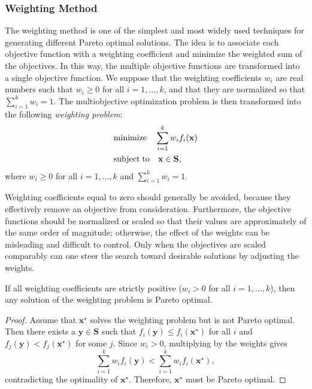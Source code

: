 \subsubsection{Weighting Method}

The weighting method is one of the simplest and most widely used techniques for generating different Pareto optimal solutions. The idea is to associate each objective function with a weighting coefficient and minimize the weighted sum of the objectives. In this way, the multiple objective functions are transformed into a single objective function. We suppose that the weighting coefficients $w_i$ are real numbers such that $w_i \geq 0$ for all $i = 1, \ldots, k$, and that they are normalized so that $\sum_{i=1}^k w_i = 1$. The multiobjective optimization problem is then transformed into the following \emph{weighting problem}:
\begin{align*}
     & \text{minimize}    \quad \sum_{i=1}^k  w_i  f_i(\mathbf{x}) \\
     & \text{subject\;to} \quad \mathbf{x} \in \mathbf{S},
\end{align*}
where $w_i \geq 0$ for all $i = 1, \ldots, k$ and $\sum_{i=1}^k w_i = 1$.

Weighting coefficients equal to zero should generally be avoided, because they effectively remove an objective from consideration. Furthermore, the objective functions should be normalized or scaled so that their values are approximately of the same order of magnitude; otherwise, the effect of the weights can be misleading and difficult to control. Only when the objectives are scaled comparably can one steer the search toward desirable solutions by adjusting the weights.

\begin{proposition}
\label{prop:weighted_method_pareto_optimal}
If all weighting coefficients are strictly positive ($w_i > 0$ for all $i = 1,\ldots,k$), then any solution of the weighting problem is Pareto optimal.
\end{proposition}
\begin{proof}
Assume that $\mathbf{x}^\star$ solves the weighting problem but is not Pareto optimal. Then there exists a $\mathbf{y} \in \mathbf{S}$ such that $f_i(\mathbf{y}) \le f_i(\mathbf{x}^\star)$ for all $i$ and $f_j(\mathbf{y}) < f_j(\mathbf{x}^\star)$ for some $j$. Since $w_i>0$, multiplying by the weights gives
\[
\sum_{i=1}^k w_i f_i(\mathbf{y}) < \sum_{i=1}^k w_i f_i(\mathbf{x}^\star),
\]
contradicting the optimality of $\mathbf{x}^\star$. Therefore, $\mathbf{x}^\star$ must be Pareto optimal.
\end{proof}

